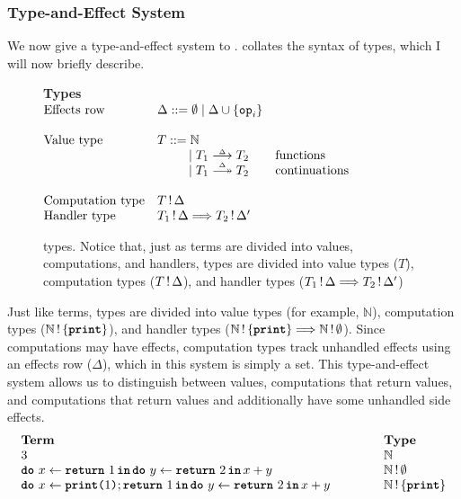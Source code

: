 \subsubsection{Type-and-Effect System}
We now give a type-and-effect system to \efflang{}.  collates the syntax of \efflang{} types, which I will now briefly describe. 

\begin{figure}
  \begin{eff-desc}
  {\large \textbf{Types}}\\

  $\begin{array}{@{}lllr}
    \text{Effects row} & \Delta ::= \emptyset \mid \Delta \cup \{ \texttt{op}_i \} \\ \\
    \text{Value type} & T ::= \mathbb{N} & \\
                              &\quad\quad\,\,\, \mid \functionType{T_1}{T_2} & \text{functions}\\
                              &\quad\quad\,\,\, \mid \continuationType{T_1}{T_2} & \text{continuations}\\ \\
    \text{Computation type} & \effectType{T} \\
    \text{Handler type} & \handlerType{\effectType{T_1}}{\effectType[\Delta']{T_2}}
  \end{array}$
  \end{eff-desc}
  \caption{\efflang{} types. Notice that, just as terms are divided into values, computations, and handlers, types are divided into value types ($T$), computation types ($\effectType{T}$), and handler types ($\handlerType{\effectType{T_1}}{\effectType[\Delta']{T_2}}$)}
  \label{fig:efflang-type-syntax}
\end{figure}

Just like terms, types are divided into value types (for example, $\mathbb{N}$), computation types ($\effectType[\{\textbf{\texttt{print}} \}]{\mathbb{N}}$), and handler types ($\handlerType{\effectType[\{\textbf{\texttt{print}} \}]{\mathbb{N}}}{\effectType[\emptyset]{\mathbb{N}}}$). Since computations may have effects, computation types track unhandled effects using an effects row ($\Delta$), which in this system is simply a set. This type-and-effect system allows us to distinguish between values, computations that return values, and computations that return values and additionally have some unhandled side effects.
\[
\begin{array}{lll}
  \textbf{Term} &\hspace{8mm}& \textbf{Type} \\
  3 && \mathbb{N} \\ 
  \bind{x}{\return{1}}{\bind{y}{\return{2}}{x + y}} &&  \effectType[\emptyset]{\mathbb{N}} \\ 
  \bind{x}{\texttt{\textbf{print}($1$)}; \return{1}}{\bind{y}{\return{2}}{x + y}} &&  \effectType[\{ \texttt{\textbf{print}}\}]{\mathbb{N}} \\ 
\end{array}
\]

